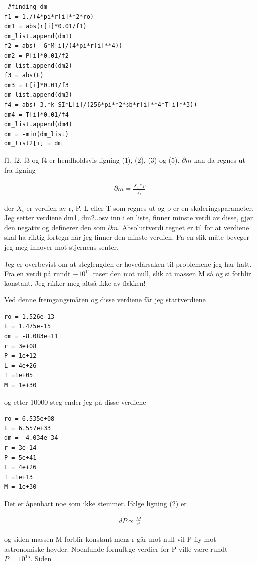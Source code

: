 \documentclass[norsk,a4paper,12pt]{article}
\begin{document}
\begin{lstlisting}
 #finding dm
f1 = 1./(4*pi*r[i]**2*ro)
dm1 = abs(r[i]*0.01/f1)
dm_list.append(dm1)
f2 = abs(- G*M[i]/(4*pi*r[i]**4))
dm2 = P[i]*0.01/f2
dm_list.append(dm2)
f3 = abs(E)
dm3 = L[i]*0.01/f3
dm_list.append(dm3)
f4 = abs(-3.*k_SI*L[i]/(256*pi**2*sb*r[i]**4*T[i]**3))
dm4 = T[i]*0.01/f4
dm_list.append(dm4)
dm = -min(dm_list)
dm_list2[i] = dm
\end{lstlisting}

f1, f2, f3 og f4 er hendholdsvis ligning (1), (2), (3) og (5). $\partial m $ kan da regnes ut fra ligning

\begin{align*}
\partial m  = \frac{X_i*p}{f_i}
\end{align*}

der $X_i$ er verdien av r, P, L eller T som regnes ut og p er en skaleringsparameter. Jeg setter verdiene dm1, dm2..osv 
inn i en liste, finner minste verdi av disse, gjør den negativ og definerer den som $\partial m $.
Absoluttverdi tegnet er til for at verdiene skal ha riktig 
fortegn når jeg finner den minste verdien. På en slik måte beveger jeg meg innover mot stjernens senter.

Jeg er overbevist om at steglengden er hovedårsaken til problemene jeg har hatt. Fra en verdi på rundt $-10^{11} $ raser 
den mot null, slik at massen M så og si forblir konstant. Jeg rikker meg altså ikke av flekken!

Ved denne fremgangsmåten og disse verdiene får jeg startverdiene

\begin{lstlisting}
ro = 1.526e-13
E = 1.475e-15
dm = -8.083e+11
r = 3e+08
P = 1e+12
L = 4e+26
T =1e+05
M = 1e+30

\end{lstlisting}

og etter 10000 steg ender jeg på disse verdiene

\begin{lstlisting}
ro = 6.535e+08
E = 6.557e+33
dm = -4.034e-34
r = 3e-14
P = 5e+41
L = 4e+26
T =1e+13
M = 1e+30
\end{lstlisting}

Det er åpenbart noe som ikke stemmer. Ifølge ligning (2) er

\begin{align*}
 dP \propto \frac{M}{r^4}
\end{align*}

og siden massen M forblir konstant mens r går mot null vil P fly mot astronomiske høyder.
Noenlunde fornuftige verdier for P ville være rundt $P = 10^{15} $. Siden 
\end{document}
